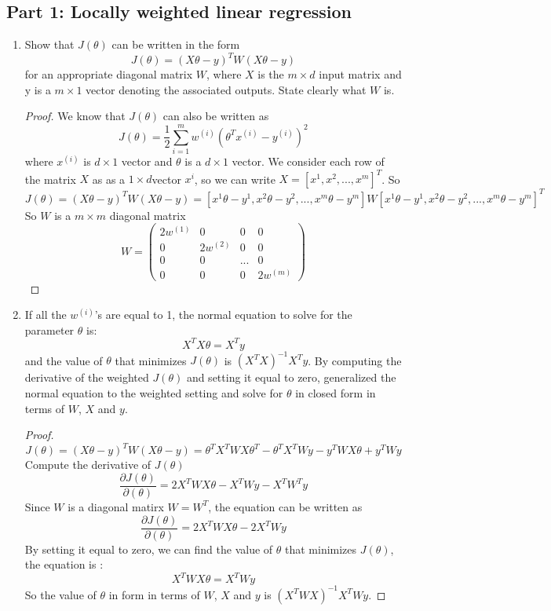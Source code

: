 \documentclass[]{book}
\theoremstyle{definition}
\begin{document}
\subsection*{Part 1: Locally weighted linear regression}
\begin{enumerate}
	\item Show that $J(\theta)$ can be written in the form
	$$J(\theta)=(X \theta - y)^T W (X \theta - y)$$
	for an appropriate diagonal matrix $W$, where $X$ is the $m \times d$ input matrix and y is a $m \times 1$ vector denoting the associated outputs. State clearly what $W$ is.
\begin{proof}
	We know that $J(\theta)$ can also be written as 
	$$J(\theta)=\frac{1}{2} \sum_{i=1}^{m} w^{(i)} (\theta^T x^{(i)} - y^{(i)})^2$$
	where $x^{(i)}$ is $d \times 1$ vector and $\theta$ is a $d \times 1$ vector. We consider each row of the matrix $X$ as as a $1 \times d$vector $x^i$, so we can write $X = [x^1, x^2, ..., x^m]^T$. So
	$$J(\theta)=(X \theta - y)^T W (X \theta - y)
	=[x^1 \theta - y^1, x^2 \theta - y^2,...,x^m \theta - y^m] W [x^1 \theta - y^1, x^2 \theta - y^2,...,x^m \theta - y^m]^T$$
	So $W$ is a $m \times m$ diagonal matrix
	$$W=\left(\begin{matrix}
	2 w^{(1)} & 0 & 0 & 0 \\ 
		0 & 2 w^{(2)} & 0 & 0 \\ 
		0 & 0 & ... & 0  \\ 
		0 & 0 & 0 & 2 w^{(m)}
	
	\end{matrix}\right)$$ 
\end{proof}
	
	\item If all the $w^{(i)}$'s are equal to 1, the normal equation to solve for the parameter $\theta$ is:
	$$X^T X \theta = X^T y$$
	and the value of $\theta$ that minimizes $J(\theta)$ is $(X^T X)^{-1} X^T y$. By computing the derivative of the weighted $J(\theta)$ and setting it equal to zero, generalized the normal equation to the weighted setting and solve for $\theta$ in closed form in terms of $W$, $X$ and $y$.
\begin{proof}
	$$J(\theta)=(X \theta - y)^T W (X \theta - y)=\theta^T X^T W X \theta^T - \theta^T X^T W y - y^T W X \theta + y^T W y$$
	Compute the derivative of $J(\theta)$
	$$\frac{\partial{J(\theta)}}{\partial(\theta)}=2 X^T W X \theta -X^T W y - X^T W^T y$$
	Since $W$ is a diagonal matirx $W = W^T$, the equation can be written as
	$$\frac{\partial{J(\theta)}}{\partial(\theta)} = 2 X^T W X \theta -2 X^T W y$$
	By setting it equal to zero, we can find the value of $\theta$ that minimizes $J(\theta)$, the equation is :
	$$X^T W X \theta = X^T W y $$
	So the value of $\theta$ in form in terms of $W$, $X$ and $y$ is $(X^T W X)^{-1} X^T W y$.
\end{proof} 


\end{enumerate}
\end{document}
